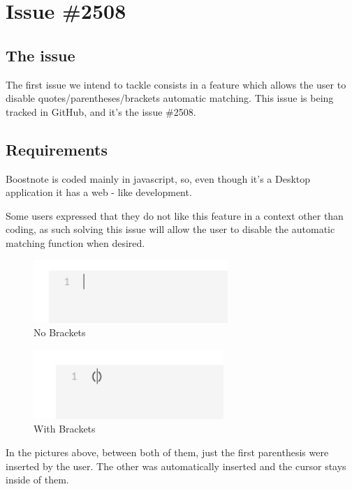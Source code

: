 \section{Issue \#2508}\label{issue-2508}

\subsection{The issue}\label{the-issue}

The first issue we intend to tackle consists in a feature which allows
the user to disable quotes/parentheses/brackets automatic matching. This
issue is being tracked in GitHub, and it's the issue \#2508.

\subsection{Requirements}\label{requirements}

Boostnote is coded mainly in javascript, so, even though it's a Desktop
application it has a web - like development.

Some users expressed that they do not like this feature in a context
other than coding, as such solving this issue will allow the user to
disable the automatic matching function when desired.

\begin{figure}
\centering
\includegraphics[height=0.93750in]{../noBracketsEx.png}
\caption{No Brackets}
\end{figure}

\begin{figure}
\centering
\includegraphics[height=1.04167in]{../bracketsEx.png}
\caption{With Brackets}
\end{figure}

In the pictures above, between both of them, just the first parenthesis
were inserted by the user. The other was automatically inserted and the
cursor stays inside of them.

